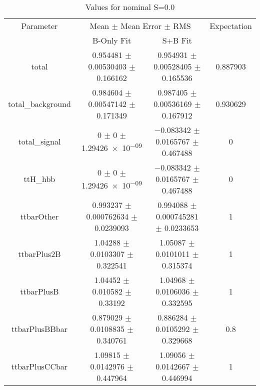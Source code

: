 \begin{table}
\centering
\caption{Values for nominal S=0.0}
\begin{tabular}{cccc}
\toprule
Parameter & \multicolumn{2}{c}{Mean $\pm$ Mean Error $\pm$ RMS} & Expectation\\
 & B-Only Fit & S+B Fit & \\
\midrule
total & \num{0.954481} $\pm$ \num{0.00530403} $\pm$ \num{0.166162} & \num{0.954931} $\pm$ \num{0.00528405} $\pm$ \num{0.165536} & \num{0.887903}\\
total\_background & \num{0.984604} $\pm$ \num{0.00547142} $\pm$ \num{0.171349} & \num{0.987405} $\pm$ \num{0.00536169} $\pm$ \num{0.167912} & \num{0.930629}\\
total\_signal & \num{0} $\pm$ \num{0} $\pm$ \num{1.29426e-09} & \num{-0.083342} $\pm$ \num{0.0165767} $\pm$ \num{0.467488} & \num{0}\\
ttH\_hbb & \num{0} $\pm$ \num{0} $\pm$ \num{1.29426e-09} & \num{-0.083342} $\pm$ \num{0.0165767} $\pm$ \num{0.467488} & \num{0}\\
ttbarOther & \num{0.993237} $\pm$ \num{0.000762634} $\pm$ \num{0.0239093} & \num{0.994088} $\pm$ \num{0.000745281} $\pm$ \num{0.0233653} & \num{1}\\
ttbarPlus2B & \num{1.04288} $\pm$ \num{0.0103307} $\pm$ \num{0.322541} & \num{1.05087} $\pm$ \num{0.0101011} $\pm$ \num{0.315374} & \num{1}\\
ttbarPlusB & \num{1.04452} $\pm$ \num{0.010582} $\pm$ \num{0.33192} & \num{1.04968} $\pm$ \num{0.0106036} $\pm$ \num{0.332595} & \num{1}\\
ttbarPlusBBbar & \num{0.879029} $\pm$ \num{0.0108835} $\pm$ \num{0.340761} & \num{0.886284} $\pm$ \num{0.0105292} $\pm$ \num{0.329668} & \num{0.8}\\
ttbarPlusCCbar & \num{1.09815} $\pm$ \num{0.0142976} $\pm$ \num{0.447964} & \num{1.09056} $\pm$ \num{0.0142667} $\pm$ \num{0.446994} & \num{1}\\
\bottomrule
\end{tabular}
\end{table}